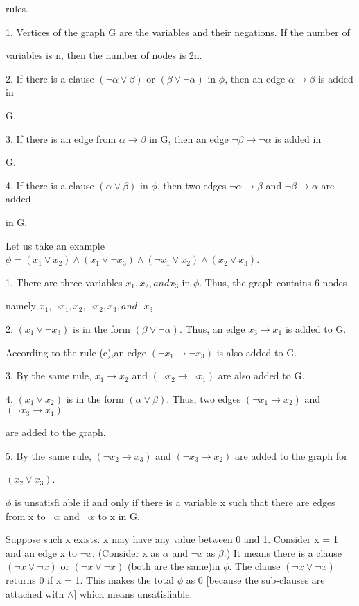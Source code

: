 \documentclass[10pt,a4paper]{book}
\begin{document}
rules.

1. Vertices of the graph G are the variables and their negations. If the number of 

\quad variables is n, then the number of nodes is 2n.

2. If there is a clause $(\neg \alpha \vee \beta)$ or $(\beta \vee \neg\alpha)$ in $\phi$, then an edge $\alpha \rightarrow \beta$ is added in 

G.

3. If there is an edge from $\alpha \rightarrow \beta$ in G, then an edge $\neg\beta \rightarrow \neg\alpha$ is added in 

G.

4. If there is a clause $(\alpha \vee \beta)$ in $\phi$, then two edges $\neg\alpha \rightarrow \beta$ and $\neg\beta \rightarrow \alpha$ are added

in G.

\quad

Let us take an example $\phi = (x_{1} \vee x_{2}) \wedge (x_{1} \vee \neg x_{3}) \wedge (\neg x_{1} \vee x_{2}) \wedge (x_{2} \vee x_{3})$.

1. There are three variables $x_{1}, x_{2}, and x_{3}$ in $\phi$. Thus, the graph contains 6 nodes
 
namely $x_{1}, \neg x_{1}, x_{2},\neg x_{2}, x_{3}, and \neg x_{3}$.

2. $(x_{1} \vee \neg x_{3})$ is in the form $(\beta \vee \neg \alpha)$. Thus, an edge $x_{3} \rightarrow x_{1}$ is added to G.
 
According to the rule (c),an edge $(\neg x_{1} \rightarrow \neg x_{3})$ is also added to G.

3. By the same rule, $x_{1} \rightarrow x_{2}$ and $(\neg x_{2} \rightarrow \neg x_{1})$ are also added to G.

4. $(x_{1} \vee x_{2})$ is in the form $(\alpha \vee \beta)$. Thus, two edges $(\neg x_{1} \rightarrow x_{2})$ and $(\neg x_{3} \rightarrow x_{1})$ 

are added to the graph.

5. By the same rule, $(\neg x_{2} \rightarrow x_{3})$ and $(\neg x_{3} \rightarrow x_{2})$ are added to the graph for

$(x_{2} \vee x_{3})$.

$\phi$ is unsatisfi able if and only if there is a variable x such that there are edges from x to $\neg x$ and $\neg x$ to x in G.

\footnotesize
Suppose such x exists. x may have any value between 0 and 1. Consider x = 1 and an edge x to $\neg x$.
(Consider x as $\alpha$ and $\neg x$ as $\beta$.) It means there is a clause $(\neg x \vee \neg x)$ or $(\neg x \vee \neg x)$ (both are the same)in $\phi$. The clause $(\neg x \vee \neg x)$ returns 0 if x = 1. This makes the total $\phi$ as 0 [because the sub-clauses are attached with $\wedge$] which means unsatisfiable.
\end{document}
